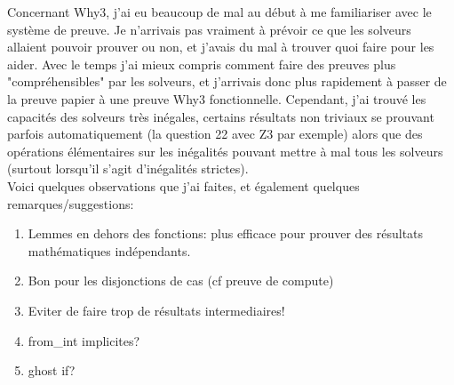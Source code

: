 \documentclass[a4paper]{article}%
\begin{document}
	Concernant Why3, j'ai eu beaucoup de mal au début à me familiariser avec le système de preuve.
	Je n'arrivais pas vraiment à prévoir ce que les solveurs allaient pouvoir prouver ou non,
	et j'avais du mal à trouver quoi faire pour les aider. Avec le temps j'ai mieux compris comment faire des preuves plus "compréhensibles"
	par les solveurs, et j'arrivais donc plus rapidement à passer de la preuve papier à une preuve Why3 fonctionnelle.
	Cependant, j'ai trouvé les capacités des solveurs très inégales, certains résultats non triviaux
	se prouvant parfois automatiquement (la question 22 avec Z3 par exemple) alors que des opérations élémentaires
	sur les inégalités pouvant mettre à mal tous les solveurs (surtout lorsqu'il s'agit d'inégalités strictes).\\

	Voici quelques observations que j'ai faites, et également quelques remarques/suggestions:
	\begin{enumerate}
		\item Lemmes en dehors des fonctions: plus efficace pour prouver des résultats mathématiques indépendants.
		\item Bon pour les disjonctions de cas (cf preuve de compute)
		\item Eviter de faire trop de résultats intermediaires!
		\item from\_int implicites?
		\item ghost if?
	\end{enumerate}
\end{document}
